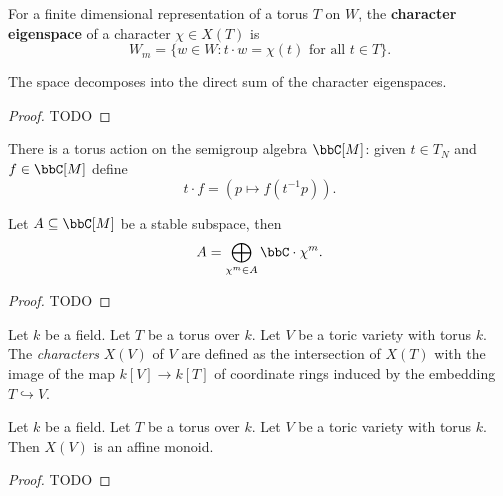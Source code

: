 \begin{definition}
  \label{1-1-char-eigenspace}

  For a finite dimensional representation of a torus $T$ on $W$, the {\bf character eigenspace} of a character $\chi \in X(T)$ is
  \[
    W_m = \{w\in W : t\cdot w = \chi(t)\text{ for all } t\in T \}.
  \]
\end{definition}


\begin{proposition}
  \label{1-1-2-char-eigenspace-direct-sum}

  The space decomposes into the direct sum of the character eigenspaces.
\end{proposition}
\begin{proof}

  TODO
\end{proof}


\begin{definition}
  \label{1-1-tor-act-alg}

  There is a torus action on the semigroup algebra $\bbC[M]$: given $t\in T_N$ and $f\in \bbC[M]$ define
  \[
    t \cdot f = (p \mapsto f(t^{-1}p)).
  \]
\end{definition}


\begin{lemma}
  \label{1-1-16-total-red}
    Let $A \subseteq \bbC[M]$ be a stable subspace, then
    \[
      A = \bigoplus_{\chi^m \in A} \bbC \cdot \chi^m.
    \]
\end{lemma}
\begin{proof}

  TODO
\end{proof}


\begin{definition}
  \label{5-2-char-tor-var}

  Let $k$ be a field.
  Let $T$ be a torus over $k$.
  Let $V$ be a toric variety with torus $k$.
  The \emph{characters} $X(V)$ of $V$ are defined as the intersection of $X(T)$
  with the image of the map $k[V] \to k[T]$ of coordinate rings
  induced by the embedding $T \hookrightarrow V$.
\end{definition}


\begin{proposition}
  \label{5-2-char-tor-var-aff-mon}

  Let $k$ be a field.
  Let $T$ be a torus over $k$.
  Let $V$ be a toric variety with torus $k$.
  Then $X(V)$ is an affine monoid.
\end{proposition}
\begin{proof}

  TODO
\end{proof}

